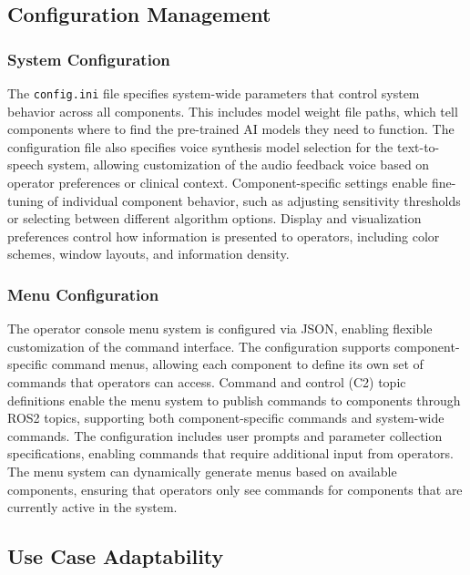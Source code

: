 \documentclass[12pt,a4paper]{article}
\begin{document}
\subsection{Configuration Management}

\subsubsection{System Configuration}

The \texttt{config.ini} file specifies system-wide parameters that control system behavior across all components. This includes model weight file paths, which tell components where to find the pre-trained AI models they need to function. The configuration file also specifies voice synthesis model selection for the text-to-speech system, allowing customization of the audio feedback voice based on operator preferences or clinical context. Component-specific settings enable fine-tuning of individual component behavior, such as adjusting sensitivity thresholds or selecting between different algorithm options. Display and visualization preferences control how information is presented to operators, including color schemes, window layouts, and information density.

\subsubsection{Menu Configuration}

The operator console menu system is configured via JSON, enabling flexible customization of the command interface. The configuration supports component-specific command menus, allowing each component to define its own set of commands that operators can access. Command and control (C2) topic definitions enable the menu system to publish commands to components through ROS2 topics, supporting both component-specific commands and system-wide commands. The configuration includes user prompts and parameter collection specifications, enabling commands that require additional input from operators. The menu system can dynamically generate menus based on available components, ensuring that operators only see commands for components that are currently active in the system.

\subsection{Use Case Adaptability}
\end{document}
